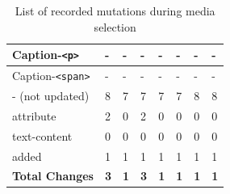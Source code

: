 \documentclass[a4paper, 10pt]{article}
\begin{document}
\begin{table}[!ht]
\begin{adjustbox}{angle=90}
\begin{tabular}{|l|l|l|l|l|l|l|l|}
      Caption-\verb|<p>|              & -                 & -               & -                   & -             & -               & -               & -               \\ \hline
      Caption-\verb|<span>|           & -                 & -               & -                   & -             & -               & -               & -               \\ \hline
      \hline
      - (not updated)                 & 8                 & 7               & 7                   & 7             & 7               & 8               & 8               \\ \hline
      \hline
      attribute                       & 2                 & 0               & 2                   & 0             & 0               & 0               & 0               \\ \hline
      text-content                    & 0                 & 0               & 0                   & 0             & 0               & 0               & 0               \\ \hline
      added                           & 1                 & 1               & 1                   & 1             & 1               & 1               & 1               \\ \hline\hline
      \textbf{Total Changes}          & \textbf{3}        & \textbf{1}      & \textbf{3}          & \textbf{1}    & \textbf{1}      & \textbf{1}      & \textbf{1}      \\ \hline
    \end{tabular}
  \end{adjustbox}
  \caption{List of recorded mutations during media selection}
  \label{tab:mutations:mediaSelection}
\end{table}
\end{document}
